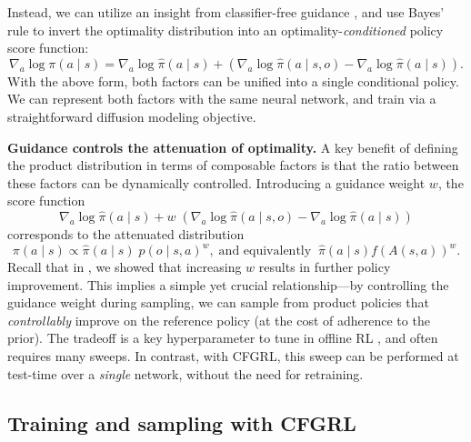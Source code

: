 \documentclass{article}
\begin{document}
Instead, we can utilize an insight from classifier-free guidance \citep{cfg_ho2022}, and use Bayes' rule to invert the optimality distribution into an optimality-\textit{conditioned} policy score function:
\begin{equation}
    \nabla_a \log \pi(a \mid s) = \nabla_a \log \hat{\pi}(a \mid s) +  (\nabla_a \log\hat{\pi}(a \mid s,o) - \nabla_a \log \hat{\pi}(a \mid s)).
    \label{eq:inversion}
\end{equation}
With the above form, both factors can be unified into a single conditional policy. We can represent both factors with the same neural network, and train via a straightforward diffusion modeling objective.

\textbf{Guidance controls the attenuation of optimality.} A key benefit of defining the product distribution in terms of composable factors is that the ratio between these factors can be dynamically controlled. Introducing a guidance weight $w$, the score function
\begin{equation}
    \nabla_a \log \hat{\pi}(a \mid s) +  w \;(\nabla_a \log\hat{\pi}(a \mid s,o) - \nabla_a \log \hat{\pi}(a \mid s)) 
\end{equation}
corresponds to the attenuated distribution
\begin{equation}
    \pi(a \mid s) \propto \hat{\pi}(a \mid s) \; p(o \mid s,a)^w, \; \text{and equivalently} \; \; \hat{\pi}(a \mid s)  f(A(s,a))^w.
\end{equation}
Recall that in , we showed that increasing $w$ results in further policy improvement. This implies a simple yet crucial relationship---by controlling the guidance weight during sampling, we can sample from product policies that \textit{controllably} improve on the reference policy (at the cost of adherence to the prior). The tradeoff is a key hyperparameter to tune in offline RL \citep{bottleneck_park2024}, and often requires many sweeps. In contrast, with CFGRL, this sweep can be performed at test-time over a \textit{single} network, without the need for retraining.











\vspace*{-4pt}
\subsection{Training and sampling with CFGRL}
\vspace*{-4pt}
\label{section:training}
\end{document}
